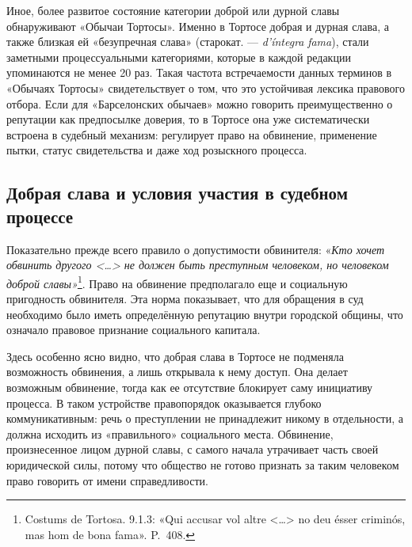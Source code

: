 Иное, более развитое состояние категории доброй или дурной славы обнаруживают «Обычаи Тортосы». Именно в Тортосе добрая и дурная слава, а также близкая ей «безупречная слава» (старокат. --- \emph{d’íntegra}\emph{ }\emph{fama}), стали заметными процессуальными категориями, которые в каждой редакции упоминаются не менее 20 раз. Такая частота встречаемости данных терминов в «Обычаях Тортосы» свидетельствует о том, что это устойчивая лексика правового отбора. Если для «Барселонских обычаев» можно говорить преимущественно о репутации как предпосылке доверия, то в Тортосе она уже систематически встроена в судебный механизм: регулирует право на обвинение, применение пытки, статус свидетельства и даже ход розыскного процесса.

\subsection{Добрая слава и условия участия в судебном процессе}

Показательно прежде всего правило о допустимости обвинителя: «\emph{Кто хочет обвинить другого <…> не должен быть преступным человеком, но человеком доброй славы»}\footnote{Costums de Tortosa. 9.1.3: «Qui accusar vol altre <…> no deu ésser criminós, mas hom de bona fama». P.~408.}. Право на обвинение предполагало еще и социальную пригодность обвинителя. Эта норма показывает, что для обращения в суд необходимо было иметь определённую репутацию внутри городской общины, что означало правовое признание социального капитала.

Здесь особенно ясно видно, что добрая слава в Тортосе не подменяла возможность обвинения, а лишь открывала к нему доступ. Она делает возможным обвинение, тогда как ее отсутствие блокирует саму инициативу процесса. В таком устройстве правопорядок оказывается глубоко коммуникативным: речь о преступлении не принадлежит никому в отдельности, а должна исходить из «правильного» социального места. Обвинение, произнесенное лицом дурной славы, с самого начала утрачивает часть своей юридической силы, потому что общество не готово признать за таким человеком право говорить от имени справедливости.


